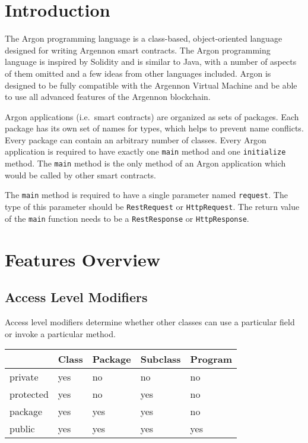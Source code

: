 

\section{Introduction}\label{sec:introduction2}

The Argon programming language is a class-based, object-oriented language designed for writing Argennon smart
contracts. The Argon programming language is inspired by Solidity and is similar to Java, with a number of aspects
of them omitted and a few ideas from other languages included. Argon is designed to be fully compatible with
the Argennon Virtual Machine and be able to use all advanced features of the Argennon blockchain.

Argon applications (i.e.\ smart contracts) are organized as sets of packages. Each package has its own set of names
for types, which helps to prevent name conflicts. Every package can contain an arbitrary number of classes.
Every Argon application is required
to have exactly one \texttt{main} method and one \texttt{initialize} method. The \texttt{main} method is the
only method of an Argon application which would be called by other smart contracts.

The \texttt{main} method is required to have a single parameter named \texttt{request}. The type of this parameter
should be \texttt{RestRequest} or \texttt{HttpRequest}. The return value of the \texttt{main} function needs to be a
\texttt{RestResponse} or \texttt{HttpResponse}.


\section{Features Overview}\label{sec:features-overview}

\subsection{Access Level Modifiers}\label{subsec:access-level-modifiers}

Access level modifiers determine whether other classes can use a particular field or invoke a particular method.

\begin{center}
    \begin{tabular}{lllll}
        \hline
        & Class & Package & Subclass & Program \\
        \hline
        private   & yes   & no      & no       & no  \\
        protected & yes   & no      & yes      & no  \\
        package   & yes   & yes     & yes      & no  \\
        public    & yes   & yes     & yes      & yes \\
        \hline
    \end{tabular}\label{tab:table}
\end{center}


